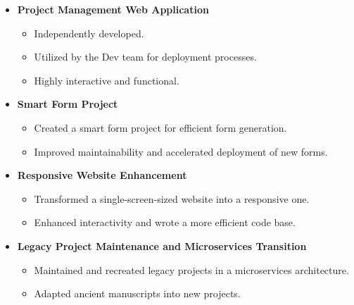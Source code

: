 \documentclass[oneside]{article}
\begin{document}
{\begin{minipage}[t][\dimexpr\textheight-2\fboxrule-2\fboxsep\relax][t]{\dimexpr0.55\textwidth-2\fboxrule-2\fboxsep\relax}
\begin{itemize}
            \item \textbf{\normalsize Project Management Web Application}
            \vspace{-0.5\baselineskip} 
            \begin{itemize}
                \item Independently developed.
                \item Utilized by the Dev team for deployment processes.
                \item Highly interactive and functional.
            \end{itemize}
            \vspace{0.5\baselineskip} 

            \item \textbf{\normalsize Smart Form Project}
            \vspace{-0.5\baselineskip} 
            \begin{itemize}
                \item Created a smart form project for efficient form generation.
                \item Improved maintainability and accelerated deployment of new forms.
            \end{itemize}
            \vspace{0.5\baselineskip} 

            \item \textbf{\normalsize Responsive Website Enhancement}
            \vspace{-0.5\baselineskip} 
            \begin{itemize}
                \item Transformed a single-screen-sized website into a responsive one.
                \item Enhanced interactivity and wrote a more efficient code base.
            \end{itemize}
            \vspace{0.5\baselineskip} 

            \item \textbf{\normalsize Legacy Project Maintenance and Microservices Transition}
            \vspace{-0.5\baselineskip} 
            \begin{itemize}
                \item Maintained and recreated legacy projects in a microservices architecture.
                \item Adapted ancient manuscripts into new projects.
            \end{itemize}
            \vspace{0.5\baselineskip} 


\end{itemize}
\end{minipage}}
\end{document}
